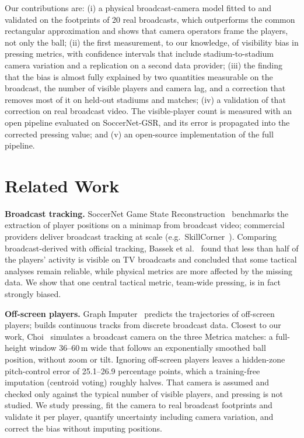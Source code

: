\documentclass[runningheads]{llncs}
\begin{document}
\noindent Our contributions are:
(i) a physical broadcast-camera model fitted to and validated on the footprints of 20 real broadcasts, which
outperforms the common rectangular approximation and shows that camera operators frame the players, not only the ball;
(ii) the first measurement, to our knowledge, of visibility bias in pressing metrics, with confidence intervals that include
stadium-to-stadium camera variation and a replication on a second data provider;
(iii) the finding that the bias is almost fully explained by two quantities measurable on the broadcast, the number of
visible players and camera lag, and a correction that removes most of it on held-out stadiums and matches;
(iv) a validation of that correction on real broadcast video. The visible-player count is measured with an open
pipeline evaluated on SoccerNet-GSR, and its error is propagated into the corrected pressing value; and
(v) an open-source implementation of the full pipeline.

\section{Related Work}

\textbf{Broadcast tracking.} SoccerNet Game State Reconstruction~\cite{somers2024gsr} benchmarks the extraction of
player positions on a minimap from broadcast video; commercial providers deliver broadcast tracking at scale
(e.g.\ SkillCorner~\cite{skillcorner_opendata}). Comparing broadcast-derived with official tracking,
Bassek et al.~\cite{smf2025broadcast} found that less than half of the players' activity is visible on TV broadcasts and concluded
that some tactical analyses remain reliable, while physical metrics are more affected by the missing data. We show that
one central tactical metric, team-wide pressing, is in fact strongly biased.

\textbf{Off-screen players.} Graph Imputer~\cite{omidshafiei2022graphimputer} predicts the trajectories of off-screen
players; \cite{rsos2025continuous} builds continuous tracks from discrete broadcast data. Closest to our work,
Choi~\cite{offscreen2026} simulates a broadcast camera on the three Metrica matches: a full-height window 36--60\,m wide
that follows an exponentially smoothed ball position, without zoom or tilt. Ignoring off-screen players leaves a
hidden-zone pitch-control error of 25.1--26.9 percentage points, which a training-free imputation (centroid voting)
roughly halves. That camera is assumed and checked only against the typical number of visible players, and pressing is
not studied. We study pressing, fit the camera to real broadcast footprints and validate it per player, quantify
uncertainty including camera variation, and correct the bias without imputing positions.
\end{document}
